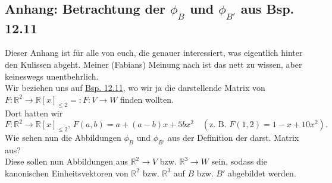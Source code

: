 \subsection[Anhang]{Anhang: Betrachtung der $\phi_B$ und $\phi_{B'}$ aus Bsp. 12.11}\label{sssec:12DarstMatrixlang}
Dieser Anhang ist für alle von euch, die genauer interessiert, was eigentlich hinter den Kulissen abgeht. Meiner (Fabians) Meinung nach ist das nett zu wissen, aber keineswegs unentbehrlich.\\
Wir beziehen uns auf \hyperref[beisp:12DarstMatrix]{Bsp. 12.11}, wo wir ja die darstellende Matrix von $F:\mathbb{R}^2\to\mathbb{R}[x]_{\leq2}=:F:V\to W$ finden wollten.\\
Dort hatten wir 
\begin{equation*}
    F:\mathbb{R}^2\to \mathbb{R}[x]_{\leq 2},\,F(a,b)=a+(a-b)x+5bx^2\quad (\text{z. B. } F(1,2)=1-x+10x^2).
\end{equation*}
Wie sehen nun die Abbildungen $\phi_B$ und $\phi_{B'}$ aus der Definition der darst. Matrix aus?\\
Diese sollen nun Abbildungen aus $\mathbb{R}^2\to V$ bzw. $\mathbb{R}^3\to W$ sein, sodass die kanonischen Einheitsvektoren von $\mathbb{R}^2$ bzw. $\mathbb{R}^3$ auf $B$ bzw. $B'$ abgebildet werden.
